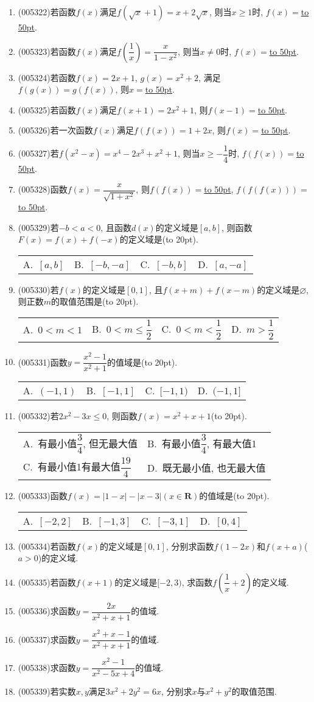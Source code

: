 \documentclass[10pt,a4paper]{article}
\newcommand{\blank}[1]{\underline{\hbox to #1pt{}}}
\newcommand{\bracket}[1]{(\hbox to #1pt{})}
\newcommand{\twoch}[4]{\par\begin{tabular}{p{.46\textwidth}p{.46\textwidth}}
A.~#1& B.~#2\\
C.~#3& D.~#4
\end{tabular}}
\newcommand{\fourch}[4]{\par\begin{tabular}{p{.23\textwidth}p{.23\textwidth}p{.23\textwidth}p{.23\textwidth}}
A.~#1 &B.~#2& C.~#3& D.~#4
\end{tabular}}
\begin{document}
\begin{enumerate}[1.]
\item {\tiny (005322)}若函数$f(x)$满足$f(\sqrt x+1)=x+2\sqrt x$, 则当$x\ge 1$时, $f(x)=$\blank{50}.
\item {\tiny (005323)}若函数$f(x)$满足$f(\dfrac 1x)=\dfrac x{1-x^2}$, 则当$x\ne 0$时, $f(x)=$\blank{50}.
\item {\tiny (005324)}若函数$f(x)=2x+1$, $g(x)=x^2+2$, 满足$f(g(x))=g(f(x))$, 则$x=$\blank{50}.
\item {\tiny (005325)}若函数$f(x)$满足$f(x+1)=2x^2+1$, 则$f(x-1)=$\blank{50}.
\item {\tiny (005326)}若一次函数$f(x)$满足$f(f(x))=1+2x$, 则$f(x)=$\blank{50}.
\item {\tiny (005327)}若$f(x^2-x)=x^4-2x^3+x^2+1$, 则当$x\ge -\dfrac 14$时, $f(f(x))=$\blank{50}.
\item {\tiny (005328)}函数$f(x)=\dfrac x{\sqrt {1+x^2}}$, 则$f(f(x))=$\blank{50}, $f(f(f(x)))=$\blank{50}.
\item {\tiny (005329)}若$-b<a<0$, 且函数$d(x)$的定义域是$[a,b]$, 则函数$F(x)=f(x)+f(-x)$的定义域是\bracket{20}.
\fourch{$[a,b]$}{$[-b,-a]$}{$[-b,b]$}{$[a,-a]$}
\item {\tiny (005330)}若$f(x)$的定义域是$[ 0,1 ]$, 且$f(x+m)+f(x-m)$的定义域是$\varnothing$, 则正数$m$的取值范围是\bracket{20}.
\fourch{$0<m<1$}{$0<m\le \dfrac 12$}{$0<m<\dfrac 12$}{$m>\dfrac 12$}
\item {\tiny (005331)}函数$y=\dfrac{x^2-1}{x^2+1}$的值域是\bracket{20}.
\fourch{$(-1,1)$}{$[-1,1]$}{$[-1,1)$}{$(-1,1]$}
\item {\tiny (005332)}若$2x^2-3x\le 0$, 则函数$f(x)=x^2+x+1$\bracket{20}.
\twoch{有最小值$\dfrac 34$, 但无最大值}{有最小值$\dfrac 34$, 有最大值1}{有最小值1有最大值$\dfrac{19}4$}{既无最小值, 也无最大值}
\item {\tiny (005333)}函数$f(x)=|1-x|-|x-3|(x\in \mathbf{R})$的值域是\bracket{20}.
\fourch{$[-2,2]$}{$[-1,3]$}{$[-3,1]$}{$[0,4]$}
\item {\tiny (005334)}若函数$f(x)$的定义域是$[0,1]$, 分别求函数$f(1-2x)$和$f(x+a)$($a>0$)的定义域.
\item {\tiny (005335)}若函数$f(x+1)$的定义域是$[-2,3)$, 求函数$f(\dfrac 1x+2)$的定义域.
\item {\tiny (005336)}求函数$y=\dfrac{2x}{x^2+x+1}$的值域.
\item {\tiny (005337)}求函数$y=\dfrac{x^2+x-1}{x^2+x+1}$的值域.
\item {\tiny (005338)}求函数$y=\dfrac{x^2-1}{x^2-5x+4}$的值域.
\item {\tiny (005339)}若实数$x,y$满足$3x^2+2y^2=6x$, 分别求$x$与$x^2+y^2$的取值范围.

\end{enumerate}
\end{document}
